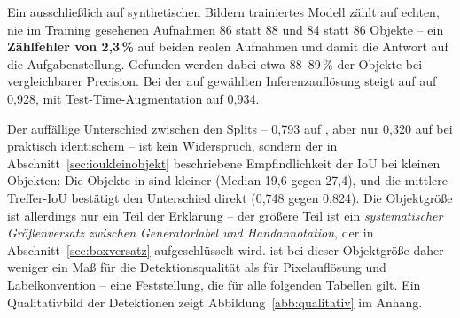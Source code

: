 \begin{table}[htbp]
\centering
\caption[Hauptergebnis]{Ergebnis des besten Modells bei nativem Maßstab.
Die Zählung steht voran, weil sie die Zielgröße der Anwendung ist
(Abschnitt~\ref{sec:metriken}); $c^*$ ist die $F_1$-optimale
Konfidenzschwelle.}
\label{tab:hauptergebnis}
\footnotesize
{}
\end{table}

Ein ausschließlich auf synthetischen Bildern trainiertes Modell zählt auf
echten, nie im Training gesehenen Aufnahmen 86 statt 88 und 84 statt 86 Objekte
-- ein \textbf{Zählfehler von 2,3\,\%} auf beiden realen Aufnahmen und damit die
Antwort auf die Aufgabenstellung. Gefunden werden dabei etwa 88--89\,\% der
Objekte bei vergleichbarer Precision. Bei der auf  gewählten Inferenzauflösung steigt
\mAPfifty{} auf  auf 0,928, mit Test-Time-Augmentation auf 0,934.

Der auffällige Unterschied zwischen den Splits -- \mAPseven{} 0,793 auf
, aber nur 0,320 auf  bei praktisch identischem
\mAPfifty{} -- ist kein Widerspruch, sondern der in
Abschnitt~\ref{sec:ioukleinobjekt} beschriebene Empfindlichkeit der IoU bei
kleinen Objekten: Die Objekte in  sind kleiner (Median 19,6 gegen
27,4\px), und die mittlere Treffer-IoU bestätigt den Unterschied direkt (0,748
gegen 0,824). Die Objektgröße ist allerdings nur ein Teil der Erklärung -- der
größere Teil ist ein \emph{systematischer Größenversatz zwischen
Generatorlabel und Handannotation}, der in
Abschnitt~\ref{sec:boxversatz} aufgeschlüsselt wird. \mAPall{} ist bei dieser
Objektgröße daher weniger ein Maß für die Detektionsqualität als für
Pixelauflösung und Labelkonvention -- eine Feststellung, die für alle folgenden
Tabellen gilt. Ein Qualitativbild der Detektionen zeigt
Abbildung~\ref{abb:qualitativ} im Anhang.


